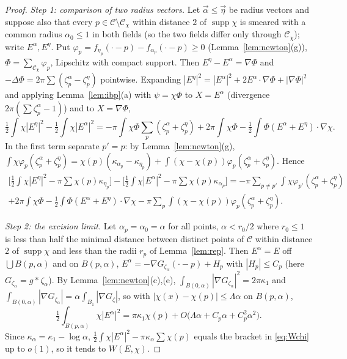 \documentclass[11pt,reqno]{amsart}
\numberwithin{equation}{section}
\theoremstyle{plain}
\theoremstyle{definition}
\newcommand{\supp}{\operatorname{supp}}
\begin{document}
\begin{proof}
\emph{Step 1: comparison of two radius vectors.}  Let $\vec\alpha\le\vec\eta$ be radius vectors and suppose also that every $p\in\mathcal C\setminus\mathcal C_\chi$ within distance $2$ of $\supp\chi$ is smeared with a common radius $\alpha_0\le1$ in both fields (so the two fields differ only through $\mathcal C_\chi$); write $E^\alpha,E^\eta$.  Put $\varphi_p=f_{\eta_p}(\cdot-p)-f_{\alpha_p}(\cdot-p)\ge0$ (Lemma~\ref{lem:newton}(g)), $\Phi=\sum_{\mathcal C_\chi}\varphi_p$, Lipschitz with compact support.  Then $E^\eta-E^\alpha=\nabla\Phi$ and $-\Delta\Phi=2\pi\sum(\zeta^\alpha_p-\zeta^\eta_p)$ pointwise.  Expanding $|E^\eta|^2=|E^\alpha|^2+2E^\alpha\cdot\nabla\Phi+|\nabla\Phi|^2$ and applying Lemma~\ref{lem:ibp}(a) with $\psi=\chi\Phi$ to $X=E^\alpha$ (divergence $2\pi(\sum\zeta^\alpha_p-1)$) and to $X=\nabla\Phi$,
\[
\tfrac12\!\int\!\chi|E^\eta|^2-\tfrac12\!\int\!\chi|E^\alpha|^2=-\pi\!\int\!\chi\Phi\sum_p(\zeta^\alpha_p+\zeta^\eta_p)+2\pi\!\int\!\chi\Phi-\tfrac12\!\int\!\Phi(E^\alpha+E^\eta)\cdot\nabla\chi .
\]
In the first term separate $p'=p$: by Lemma~\ref{lem:newton}(g), $\int\chi\varphi_p(\zeta^\alpha_p+\zeta^\eta_p)=\chi(p)(\kappa_{\alpha_p}-\kappa_{\eta_p})+\int(\chi-\chi(p))\varphi_p(\zeta^\alpha_p+\zeta^\eta_p)$.  Hence
\begin{multline}\label{eq:compare}
\Big[\tfrac12\!\int\!\chi|E^\eta|^2-\pi\sum\chi(p)\kappa_{\eta_p}\Big]-\Big[\tfrac12\!\int\!\chi|E^\alpha|^2-\pi\sum\chi(p)\kappa_{\alpha_p}\Big]=-\pi\sum_{p\ne p'}\int\chi\varphi_{p'}(\zeta^\alpha_p+\zeta^\eta_p)\\+2\pi\int\chi\Phi-\tfrac12\int\Phi(E^\alpha+E^\eta)\cdot\nabla\chi-\pi\sum_p\int(\chi-\chi(p))\varphi_p(\zeta^\alpha_p+\zeta^\eta_p).
\end{multline}

\emph{Step 2: the excision limit.}  Let $\alpha_p=\alpha_0=\alpha$ for all points, $\alpha<r_0/2$ where $r_0\le1$ is less than half the minimal distance between distinct points of $\mathcal C$ within distance $2$ of $\supp\chi$ and less than the radii $r_p$ of Lemma~\ref{lem:rep}.  Then $E^\alpha=E$ off $\bigcup B(p,\alpha)$ and on $B(p,\alpha)$, $E^\alpha=-\nabla G_{\zeta_\alpha}(\cdot-p)+H_p$ with $|H_p|\le C_p$ (here $G_{\zeta_\alpha}=g*\zeta_\alpha$).  By Lemma~\ref{lem:newton}(c),(e), $\int_{B(0,\alpha)}|\nabla G_{\zeta_\alpha}|^2=2\pi\kappa_1$ and $\int_{B(0,\alpha)}|\nabla G_{\zeta_\alpha}|=\alpha\int_{B_1}|\nabla G_\zeta|$, so with $|\chi(x)-\chi(p)|\le\Lambda\alpha$ on $B(p,\alpha)$,
\[
\tfrac12\int_{B(p,\alpha)}\chi|E^\alpha|^2=\pi\kappa_1\chi(p)+O\big(\Lambda\alpha+C_p\alpha+C_p^2\alpha^2\big).
\]
Since $\kappa_\alpha=\kappa_1-\log\alpha$, $\frac12\int\chi|E^\alpha|^2-\pi\kappa_\alpha\sum\chi(p)$ equals the bracket in \eqref{eq:Wchi} up to $o(1)$, so it tends to $W(E,\chi)$.


\end{proof}
\end{document}
